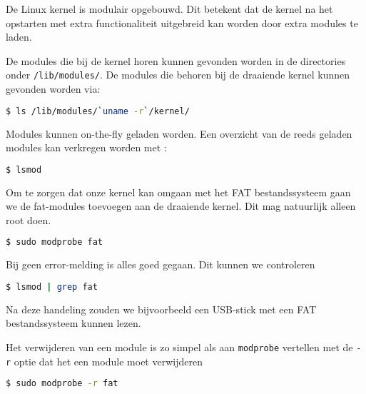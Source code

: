 De Linux kernel is modulair opgebouwd. Dit betekent dat de kernel na het opstarten met extra functionaliteit uitgebreid kan worden door extra modules te laden.

De modules die bij de kernel horen kunnen gevonden worden in de directories onder \texttt{/lib/modules/}. De modules die behoren bij de draaiende kernel kunnen gevonden worden via:
\begin{lstlisting}[language=bash]
$ ls /lib/modules/`uname -r`/kernel/
\end{lstlisting}

Modules kunnen on-the-fly geladen worden. Een overzicht van de reeds geladen modules kan verkregen worden met :
\begin{lstlisting}[language=bash]
$ lsmod
\end{lstlisting}

Om te zorgen dat onze kernel kan omgaan met het FAT bestandssysteem gaan we de fat-modules toevoegen aan de draaiende kernel. Dit mag natuurlijk alleen root doen.
\begin{lstlisting}[language=bash]
$ sudo modprobe fat
\end{lstlisting}
Bij geen error-melding is alles goed gegaan. Dit kunnen we controleren
\begin{lstlisting}[language=bash]
$ lsmod | grep fat
\end{lstlisting}
Na deze handeling zouden we bijvoorbeeld een USB-stick met een FAT bestandssysteem kunnen lezen.

Het verwijderen van een module is zo simpel als aan \texttt{modprobe} vertellen met de \texttt{-r} optie dat het een module moet verwijderen
\begin{lstlisting}[language=bash]
$ sudo modprobe -r fat
\end{lstlisting}

